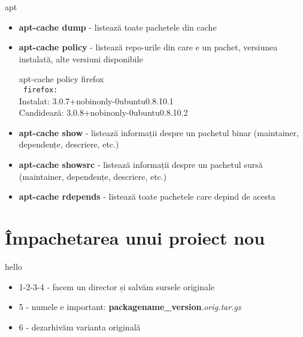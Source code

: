 \documentclass{beamer}
\begin{document}
\begin{frame}{apt}
  \begin{itemize}
  \item \textbf{apt-cache dump} - listează toate pachetele din cache
  \item \textbf{apt-cache policy} - listează repo-urile din care e un pachet, versiunea instalată, alte versiuni disponibile
    \begin{beamerboxesrounded}[lower=block body,shadow=true,width=8cm]{}
      apt-cache policy firefox \\
      \texttt{   firefox:}\\
      Instalat: 3.0.7+nobinonly-0ubuntu0.8.10.1 \\
      Candidează: 3.0.8+nobinonly-0ubuntu0.8.10.2
    \end{beamerboxesrounded}
  \item \textbf{apt-cache show} - listează informații despre un pachetul binar (maintainer, dependențe, descriere, etc.)
  \item \textbf{apt-cache showsrc} - listează informații despre un pachetul sursă (maintainer, dependențe, descriere, etc.)
  \item \textbf{apt-cache rdepends} - listează toate pachetele care depind de acesta
  \end{itemize}
\end{frame}


\section{Împachetarea unui proiect nou}
\frame{\tableofcontents[currentsection]}

\begin{frame}{hello}
  \begin{itemize}
    \begin{beamerboxesrounded}[lower=block body,shadow=true]{1\_wget.sh - luăm sursele proiectului hello}
      \small 
    \end{beamerboxesrounded}
  \item 1-2-3-4 - facem un director și salvăm sursele originale
  \item 5 - numele e important: \textbf{packagename\_version}.\textit{orig.tar.gz}
  \item 6 - dezarhivăm varianta originală
  \end{itemize}
\end{frame}
\end{document}
